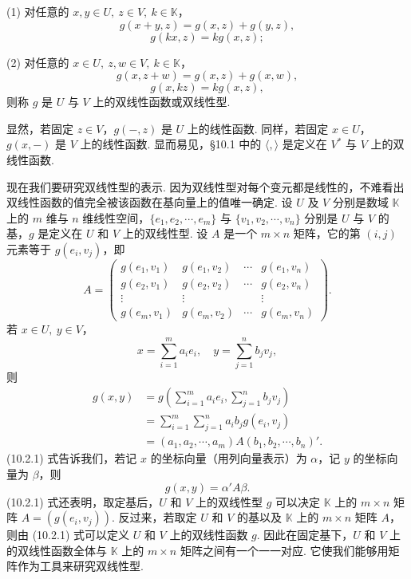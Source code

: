 \documentclass[UTF8, 12pt, fontset=fandol, oneside]{ctexart}
\begin{document}
(1) 对任意的 $x,y\in U,\ z\in V,\ k\in\mathbb K$，
\[
  g(x+y,z)=g(x,z)+g(y,z),
\]
\[
  g(kx,z)=kg(x,z);
\]

(2) 对任意的 $x\in U,\ z,w\in V,\ k\in\mathbb K$，
\[
  g(x,z+w)=g(x,z)+g(x,w),
\]
\[
  g(x,kz)=kg(x,z),
\]
则称 $g$ 是 $U$ 与 $V$ 上的双线性函数或双线性型.

显然，若固定 $z\in V$，$g(-,z)$ 是 $U$ 上的线性函数. 同样，若固定 $x\in U$，$g(x,-)$ 是 $V$ 上的线性函数. 显而易见，§10.1 中的 $\langle,\rangle$ 是定义在 $V^*$ 与 $V$ 上的双线性函数.

现在我们要研究双线性型的表示. 因为双线性型对每个变元都是线性的，不难看出双线性函数的值完全被该函数在基向量上的值唯一确定. 设 $U$ 及 $V$ 分别是数域 $\mathbb K$ 上的 $m$ 维与 $n$ 维线性空间，$\{e_1,e_2,\cdots,e_m\}$ 与 $\{v_1,v_2,\cdots,v_n\}$ 分别是 $U$ 与 $V$ 的基，$g$ 是定义在 $U$ 和 $V$ 上的双线性型. 设 $A$ 是一个 $m\times n$ 矩阵，它的第 $(i,j)$ 元素等于 $g(e_i,v_j)$，即
\[
  A=\left(\begin{array}{cccc}
  g(e_1,v_1)&g(e_1,v_2)&\cdots&g(e_1,v_n)\\
  g(e_2,v_1)&g(e_2,v_2)&\cdots&g(e_2,v_n)\\
  \vdots&\vdots&&\vdots\\
  g(e_m,v_1)&g(e_m,v_2)&\cdots&g(e_m,v_n)
  \end{array}\right).
\]
若 $x\in U,\ y\in V$，
\[
  x=\sum_{i=1}^m a_ie_i,\quad y=\sum_{j=1}^n b_jv_j,
\]
则
\begin{equation}
\begin{aligned}
  g(x,y)&=g\left(\sum_{i=1}^m a_ie_i,\sum_{j=1}^n b_jv_j\right)\\
  &=\sum_{i=1}^m\sum_{j=1}^n a_ib_jg(e_i,v_j)\\
  &=(a_1,a_2,\cdots,a_m)A(b_1,b_2,\cdots,b_n)'.
\end{aligned}
\tag{10.2.1}
\end{equation}
(10.2.1) 式告诉我们，若记 $x$ 的坐标向量（用列向量表示）为 $\alpha$，记 $y$ 的坐标向量为 $\beta$，则
\begin{equation}
  g(x,y)=\alpha' A\beta.
  \tag{10.2.2}
\end{equation}
(10.2.1) 式还表明，取定基后，$U$ 和 $V$ 上的双线性型 $g$ 可以决定 $\mathbb K$ 上的 $m\times n$ 矩阵 $A=(g(e_i,v_j))$. 反过来，若取定 $U$ 和 $V$ 的基以及 $\mathbb K$ 上的 $m\times n$ 矩阵 $A$，则由 (10.2.1) 式可以定义 $U$ 和 $V$ 上的双线性函数 $g$. 因此在固定基下，$U$ 和 $V$ 上的双线性函数全体与 $\mathbb K$ 上的 $m\times n$ 矩阵之间有一个一一对应. 它使我们能够用矩阵作为工具来研究双线性型.
\end{document}
